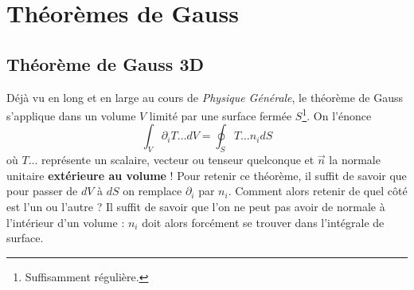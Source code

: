 \section{Théorèmes de Gauss}
    \subsection{Théorème de Gauss 3D}
    Déjà vu en long et en large au cours de \textit{Physique Générale}, le théorème de Gauss s'applique
    dans un volume $V$ limité par une surface fermée $S$\footnote{Suffisamment régulière.}. On l'énonce
    \begin{equation}
    \int_V \partial_i T\dots dV = \oint_S T\dots n_i dS
    \end{equation}
    où $T\dots$ représente un scalaire, vecteur ou tenseur quelconque et $\vec{n}$ la normale unitaire 
    \textbf{extérieure au volume} ! Pour retenir ce théorème, il suffit de savoir que pour passer de
    $dV$ à $dS$ on remplace $\partial_i$ par $n_i$. Comment alors retenir de quel côté est l'un ou
    l'autre ? Il suffit de savoir que l'on ne peut pas avoir de normale à l'intérieur d'un volume :
    $n_i$ doit alors forcément se trouver dans l'intégrale de surface.
    
